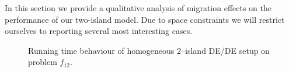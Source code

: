 \documentclass{sig-alternate}
\begin{document}
In this section we provide a qualitative analysis of migration effects on the performance of our two-island model.
Due to space constraints we will restrict ourselves to reporting several most interesting cases.

\begin{figure}[htp]
  \centering
  \quad
 \caption{Running time behaviour of homogeneous 2--island DE/DE setup on problem $f_{12}$.}
\end{figure}
\end{document}

